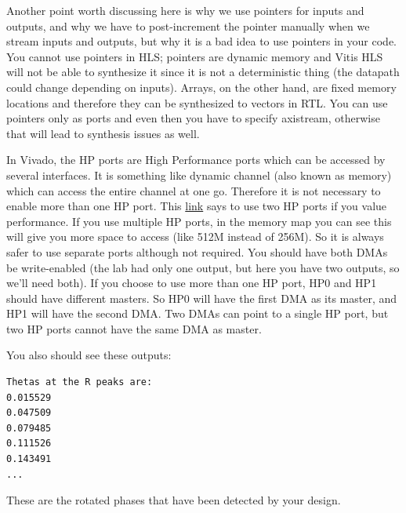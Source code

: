 \documentclass[a4paper,12pt,twoside]{article}
\begin{document}
Another point worth discussing here is why we use pointers for inputs and outputs, and why we have to post-increment the pointer manually when we stream inputs and outputs, but why it is a bad idea to use pointers in your code. You cannot use pointers in HLS; pointers are dynamic memory and Vitis HLS will not be able to synthesize it since it is not a deterministic thing (the datapath could change depending on inputs). Arrays, on the other hand, are fixed memory locations and therefore they can be synthesized to vectors in RTL. You can use pointers only as ports and even then you have to specify axistream, otherwise that will lead to synthesis issues as well.

In Vivado, the HP ports are High Performance ports which can be accessed by several interfaces. It is something like dynamic channel (also known as memory) which can access the entire channel at one go. Therefore it is not necessary to enable more than one HP port. This \href{https://forums.xilinx.com/t5/Processor-System-Design-and-AXI/MCDMA-or-Multiple-DMAs-Single-HP-port-or-Multiple-HP-ports/td-p/991992}{link} says to use two HP ports if you value performance. If you use multiple HP ports, in the memory map you can see this will give you more space to access (like 512M instead of 256M). So it is always safer to use separate ports although not required. You should have both DMAs be write-enabled (the lab had only one output, but here you have two outputs, so we’ll need both). If you choose to use more than one HP port, HP0 and HP1 should have different masters. So HP0 will have the first DMA as its master, and HP1 will have the second DMA. Two DMAs can point to a single HP port, but two HP ports cannot have the same DMA as master.

You also should see these outputs:
\begin{verbatim}
Thetas at the R peaks are:
0.015529
0.047509
0.079485
0.111526
0.143491
...
\end{verbatim}
These are the rotated phases that have been detected by your design.
\end{document}
